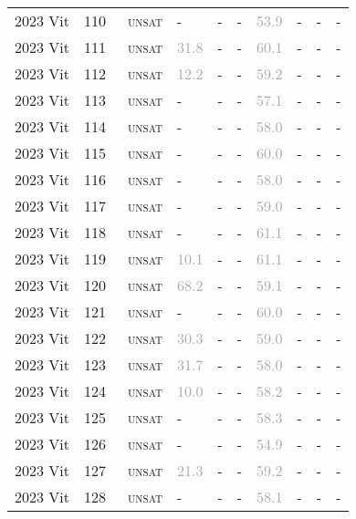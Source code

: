 \begin{center}
{\begin{longtable}{@{}llllllllll@{}}
2023 Vit & 110 & ~\textsc{unsat} & - & - & - & \textcolor{darkgray}{53.9} & - & - & - \\
2023 Vit & 111 & ~\textsc{unsat} & \textcolor{darkgray}{31.8} & - & - & \textcolor{darkgray}{60.1} & - & - & - \\
2023 Vit & 112 & ~\textsc{unsat} & \textcolor{darkgray}{12.2} & - & - & \textcolor{darkgray}{59.2} & - & - & - \\
2023 Vit & 113 & ~\textsc{unsat} & - & - & - & \textcolor{darkgray}{57.1} & - & - & - \\
2023 Vit & 114 & ~\textsc{unsat} & - & - & - & \textcolor{darkgray}{58.0} & - & - & - \\
2023 Vit & 115 & ~\textsc{unsat} & - & - & - & \textcolor{darkgray}{60.0} & - & - & - \\
2023 Vit & 116 & ~\textsc{unsat} & - & - & - & \textcolor{darkgray}{58.0} & - & - & - \\
2023 Vit & 117 & ~\textsc{unsat} & - & - & - & \textcolor{darkgray}{59.0} & - & - & - \\
2023 Vit & 118 & ~\textsc{unsat} & - & - & - & \textcolor{darkgray}{61.1} & - & - & - \\
2023 Vit & 119 & ~\textsc{unsat} & \textcolor{darkgray}{10.1} & - & - & \textcolor{darkgray}{61.1} & - & - & - \\
2023 Vit & 120 & ~\textsc{unsat} & \textcolor{darkgray}{68.2} & - & - & \textcolor{darkgray}{59.1} & - & - & - \\
2023 Vit & 121 & ~\textsc{unsat} & - & - & - & \textcolor{darkgray}{60.0} & - & - & - \\
2023 Vit & 122 & ~\textsc{unsat} & \textcolor{darkgray}{30.3} & - & - & \textcolor{darkgray}{59.0} & - & - & - \\
2023 Vit & 123 & ~\textsc{unsat} & \textcolor{darkgray}{31.7} & - & - & \textcolor{darkgray}{58.0} & - & - & - \\
2023 Vit & 124 & ~\textsc{unsat} & \textcolor{darkgray}{10.0} & - & - & \textcolor{darkgray}{58.2} & - & - & - \\
2023 Vit & 125 & ~\textsc{unsat} & - & - & - & \textcolor{darkgray}{58.3} & - & - & - \\
2023 Vit & 126 & ~\textsc{unsat} & - & - & - & \textcolor{darkgray}{54.9} & - & - & - \\
2023 Vit & 127 & ~\textsc{unsat} & \textcolor{darkgray}{21.3} & - & - & \textcolor{darkgray}{59.2} & - & - & - \\
2023 Vit & 128 & ~\textsc{unsat} & - & - & - & \textcolor{darkgray}{58.1} & - & - & - \\

\end{longtable}}
\end{center}

